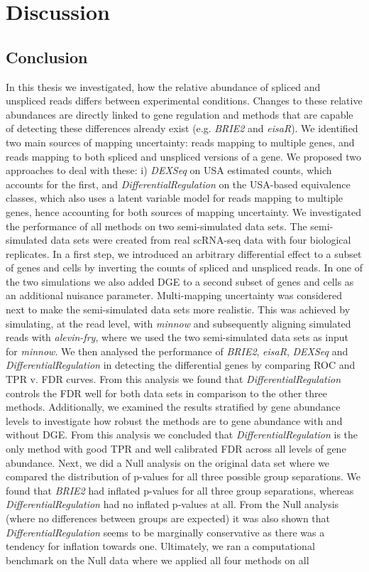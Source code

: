 

\chapter{Discussion}

\section{Conclusion} 
In this thesis we investigated, how the relative abundance of spliced and unspliced reads differs between experimental conditions. Changes to these relative abundances are directly linked to gene regulation and methods that are capable of detecting these differences already exist (e.g. \emph{BRIE2} and \emph{eisaR}). We identified two main sources of mapping uncertainty: reads mapping to multiple genes, and reads mapping to both spliced and unspliced versions of a gene. We proposed two approaches to deal with these: i) \emph{DEXSeq} on USA estimated counts, which accounts for the first, and \emph{DifferentialRegulation} on the USA-based equivalence classes, which also uses a latent variable model for reads mapping to multiple genes, hence accounting for both sources of mapping uncertainty. We investigated the performance of all methods on two semi-simulated data sets. The semi-simulated data sets were created from real scRNA-seq data with four biological replicates. In a first step, we introduced an arbitrary differential effect to a subset of genes and cells by inverting the counts of spliced and unspliced reads. In one of the two simulations we also added DGE to a second subset of genes and cells as an additional nuisance parameter. Multi-mapping uncertainty was considered next to make the semi-simulated data sets more realistic. This was achieved by simulating, at the read level, with \emph{minnow} and subsequently aligning simulated reads with \emph{alevin-fry}, where we used the two semi-simulated data sets as input for \emph{minnow}. We then analysed the performance of \emph{BRIE2}, \emph{eisaR}, \emph{DEXSeq} and \emph{DifferentialRegulation} in detecting the differential genes by comparing ROC and TPR v. FDR curves. From this analysis we found that \emph{DifferentialRegulation} controls the FDR well for both data sets in comparison to the other three methods. Additionally, we examined the results stratified by gene abundance levels to investigate how robust the methods are to gene abundance with and without DGE. From this analysis we concluded that \emph{DifferentialRegulation} is the only method with good TPR and well calibrated FDR across all levels of gene abundance. Next, we did a Null analysis on the original data set where we compared the distribution of p-values for all three possible group separations. We found that \emph{BRIE2} had inflated p-values for all three group separations, whereas \emph{DifferentialRegulation} had no inflated p-values at all. From the Null analysis (where no differences between groups are expected) it was also shown that \emph{DifferentialRegulation} seems to be marginally conservative as there was a tendency for inflation towards one. Ultimately, we ran a computational benchmark on the Null data where we applied all four methods on all 
